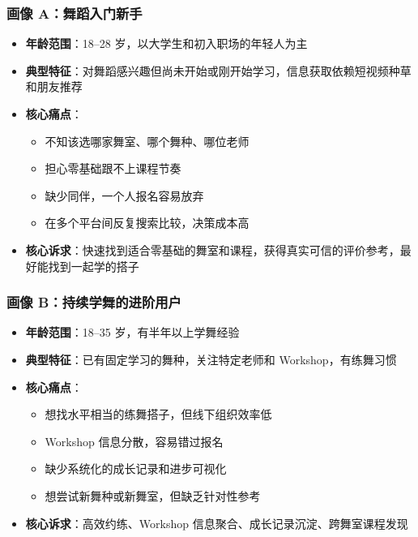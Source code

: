 \documentclass[12pt,a4paper]{ctexart}
\begin{document}
\subsubsection{画像 A：舞蹈入门新手}

\begin{itemize}
    \item \textbf{年龄范围}：18--28 岁，以大学生和初入职场的年轻人为主
    \item \textbf{典型特征}：对舞蹈感兴趣但尚未开始或刚开始学习，信息获取依赖短视频种草和朋友推荐
    \item \textbf{核心痛点}：
    \begin{itemize}
        \item 不知该选哪家舞室、哪个舞种、哪位老师
        \item 担心零基础跟不上课程节奏
        \item 缺少同伴，一个人报名容易放弃
        \item 在多个平台间反复搜索比较，决策成本高
    \end{itemize}
    \item \textbf{核心诉求}：快速找到适合零基础的舞室和课程，获得真实可信的评价参考，最好能找到一起学的搭子
\end{itemize}

\subsubsection{画像 B：持续学舞的进阶用户}

\begin{itemize}
    \item \textbf{年龄范围}：18--35 岁，有半年以上学舞经验
    \item \textbf{典型特征}：已有固定学习的舞种，关注特定老师和 Workshop，有练舞习惯
    \item \textbf{核心痛点}：
    \begin{itemize}
        \item 想找水平相当的练舞搭子，但线下组织效率低
        \item Workshop 信息分散，容易错过报名
        \item 缺少系统化的成长记录和进步可视化
        \item 想尝试新舞种或新舞室，但缺乏针对性参考
    \end{itemize}
    \item \textbf{核心诉求}：高效约练、Workshop 信息聚合、成长记录沉淀、跨舞室课程发现
\end{itemize}
\end{document}
